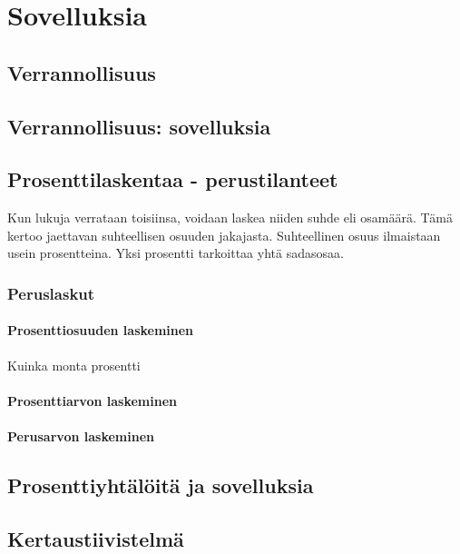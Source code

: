 %
\part{Sovelluksia}
%
%
\chapter{Verrannollisuus}
\chapter{Verrannollisuus: sovelluksia}
\chapter{Prosenttilaskentaa - perustilanteet}
Kun lukuja verrataan toisiinsa, voidaan laskea niiden suhde eli osamäärä. Tämä kertoo jaettavan suhteellisen osuuden jakajasta. Suhteellinen osuus ilmaistaan usein prosentteina. Yksi prosentti tarkoittaa yhtä sadasosaa. %





\section{Peruslaskut}

\subsection{Prosenttiosuuden laskeminen}

Kuinka monta prosentti

\subsection{Prosenttiarvon laskeminen}

\subsection{Perusarvon laskeminen}

\chapter{Prosenttiyhtälöitä ja sovelluksia}
%
%
\chapter{Kertaustiivistelmä}
